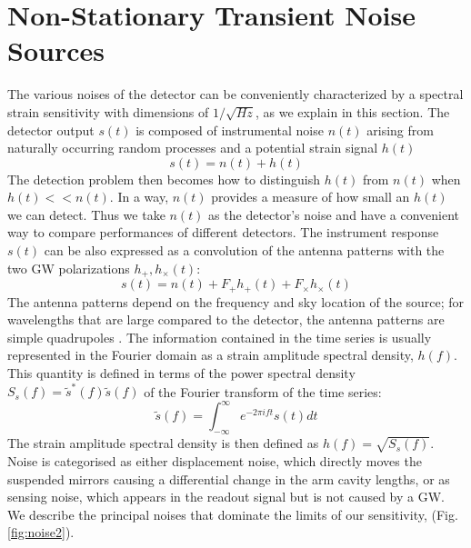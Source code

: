 \documentclass[binding=0.6cm, LaM]{sapthesis}
\begin{document}
\section{Non-Stationary Transient Noise Sources}
	
	The various noises of the detector can be conveniently characterized by a spectral strain
        sensitivity with dimensions of $1/\sqrt{Hz}$, as we explain in this section. 
        The detector output $s(t)$ is composed of instrumental noise $n(t)$ arising from
        naturally occurring random processes and a potential strain signal $h(t)$
                \begin{equation}
                	s(t) = n(t) + h(t)
                \end{equation}
        The detection problem then becomes how to distinguish $h(t)$ from $n(t)$ when $h(t) << n(t)$.
        In a way, $n(t)$ provides a measure of how small an $h(t)$ we can detect.
        Thus we take $n(t)$ as the detector’s noise and have a convenient way to
        compare performances of different detectors.
	The instrument response $s(t)$ can be also expressed as a convolution of the antenna patterns 
	with the two GW polarizations $h_{+}, h_{\times}(t)$:
		\begin{equation}
			s(t) = n(t) +  F_{+}h_{+} (t) + F_{\times}h_{\times}(t)
		\end{equation} 
	The antenna patterns depend on the frequency and sky location of the source; 
	for wavelengths that are large compared to the detector, the antenna patterns are simple quadrupoles \cite{19}.
	The information contained in the time series is usually represented in the Fourier domain 
	as a strain amplitude spectral density, $h(f)$. \\
	This quantity is defined in terms of the power spectral density $S_s(f) = \tilde s^{*}(f) \tilde s(f)$
	of the Fourier transform of the time series:
		\begin{equation}
                	\tilde s(f) = \int^{\infty}_{-\infty} e^{-2 \pi ift} s(t)dt
		\end{equation}
	The strain amplitude spectral density is then defined as $h(f) = \sqrt{S_s(f)}$.
	Noise is categorised as either displacement noise, which directly moves the suspended mirrors
        causing a differential change in the arm cavity lengths, or as sensing noise,
        which appears in the readout signal but is not caused by a GW. \\
        We describe the principal noises that dominate the limits of our sensitivity, (Fig.\,\ref{fig:noise2}).
\end{document}
